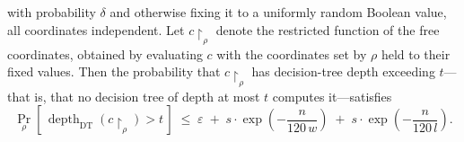 \begin{theorem}
with probability $\delta$ and otherwise fixing it to a uniformly random Boolean value,
all coordinates independent. Let $c\!\restriction_{\rho}$ denote the restricted function
of the free coordinates, obtained by evaluating $c$ with the coordinates set by $\rho$
held to their fixed values. Then the probability that $c\!\restriction_{\rho}$ has
decision-tree depth exceeding $t$—that is, that no decision tree of depth at most $t$
computes it—satisfies
\[
\Pr_{\rho}\!\left[\,
\operatorname{depth}_{\mathrm{DT}}\!\left(c\!\restriction_{\rho}\right) > t \,\right]
  \;\le\; \varepsilon \;+\; s \cdot \exp\!\left(-\frac{n}{120\,w}\right)
  \;+\; s \cdot \exp\!\left(-\frac{n}{120\,l}\right).
\]
\end{theorem}
